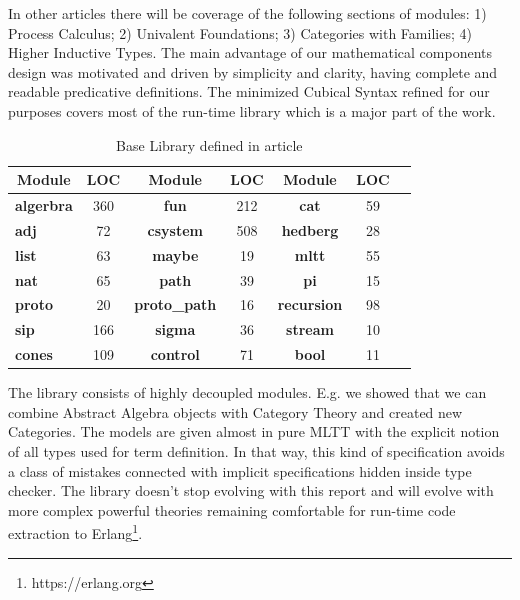 \documentclass{article}
\newcommand*{\thead}[1]{\multicolumn{1}{c}{\bfseries #1}}
\begin{document}
In other articles there will be coverage of the following sections of modules:
1) Process Calculus; 2) Univalent Foundations; 3) Categories with Families;
4) Higher Inductive Types.
The main advantage of our mathematical components design
was motivated and driven by simplicity and clarity, having complete
and readable predicative definitions. The minimized Cubical
Syntax refined for our purposes covers most of the run-time
library which is a major part of the work.

\begin{table}[h]
\centering
\caption{Base Library defined in article}
\label{tab:a}
\begin{tabular}{lcccccc}
\hline
\thead{Module}&\thead{LOC}&\thead{Module}&\thead{LOC}&\thead{Module}&\thead{LOC} \\
\hline
{\bf algerbra} & 360 & {\bf fun}         & 212 & {\bf cat}       & 59  \\
{\bf adj}      & 72  & {\bf csystem}     & 508 & {\bf hedberg}   & 28  \\
{\bf list}     & 63  & {\bf maybe}       & 19  & {\bf mltt}      & 55  \\
{\bf nat}      & 65  & {\bf path}        & 39  & {\bf pi}        & 15  \\
{\bf proto}    & 20  & {\bf proto\_path} & 16  & {\bf recursion} & 98  \\
{\bf sip}      & 166 & {\bf sigma}       & 36  & {\bf stream}    & 10  \\
{\bf cones}    & 109 & {\bf control}     & 71  & {\bf bool}      & 11  \\
\hline
\end{tabular}
\end{table}

The library consists of highly decoupled modules. E.g. we showed that we can combine
Abstract Algebra objects with Category Theory and created new Categories.
The models are given almost in pure MLTT with the explicit notion of all types used
for term definition. In that way, this kind of specification avoids a class of mistakes
connected with implicit specifications hidden inside type checker.
The library doesn't stop evolving with this report and will evolve with more
complex powerful theories remaining comfortable for run-time code extraction
to Erlang\footnote{https://erlang.org}.



\end{document}
